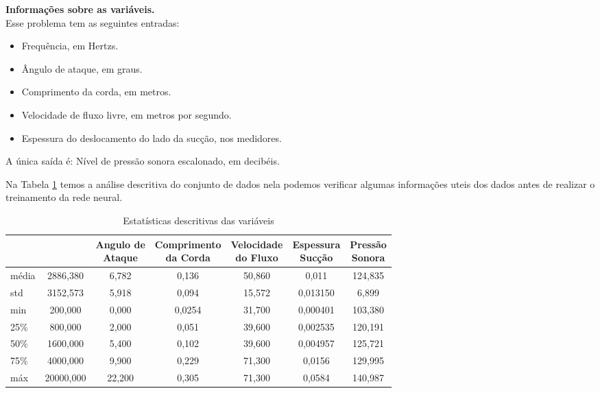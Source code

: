 \documentclass[12pt,a4paper,oneside]{report}
\newcommand{\pbfs}[1]{\noindent\textbf{#1}\\}
\newcommand{\tab}[1]{Tabela \ref{#1}}
\begin{document}
	\pbfs{Informações sobre as variáveis.}
	
	Esse problema tem as seguintes entradas:
	\begin{itemize}
		\item Frequência, em Hertzs.
		\item Ângulo de ataque, em graus.
		\item Comprimento da corda, em metros.
		\item Velocidade de fluxo livre, em metros por segundo.
		\item Espessura do deslocamento do lado da sucção, nos medidores. 
	\end{itemize}
	A única saída é: Nível de pressão sonora escalonado, em decibéis.
	
	Na \tab{tab:est_naca_0012} temos a análise descritiva do conjunto de dados nela podemos verificar algumas informações uteis dos dados antes de realizar o treinamento da rede neural.
	\begin{table}[h!]
		\centering
		\caption{Estatísticas descritivas das variáveis}
		\label{tab:est_naca_0012}
		\begin{tabular}{lcccccc}
			\toprule
			& \thead{Frequência} & \thead{Angulo de\\ Ataque} & \thead{Comprimento\\ da Corda} & \thead{Velocidade\\ do Fluxo }& \thead{Espessura\\ Suc\c{c}\~ao} & \thead{Press\~ao\\ Sonora} \\
			\midrule
			média& 2886,380&	6,782&	0,136&	50,860&	0,011&	124,835\\
			std&	3152,573&	5,918&	0,094&	15,572&	0,013150&	6,899\\
			min&	200,000&	0,000&	0,0254&	31,700&	0,000401&	103,380\\
			25\%&	800,000&	2,000&	0,051&	39,600&	0,002535&	120,191\\
			50\%&	1600,000&	5,400&	0,102&	39,600&	0,004957&	125,721\\
			75\%&	4000,000&	9,900&	0,229&	71,300&	0,0156&	129,995\\
			máx&	20000,000&	22,200&	0,305&	71,300&	0,0584&	140,987\\
			\bottomrule
		\end{tabular}
	\end{table}
\end{document}
